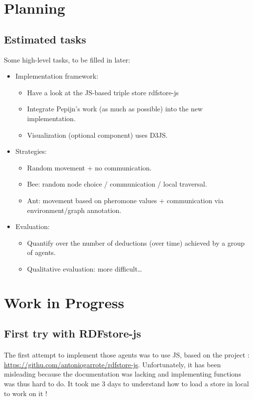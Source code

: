 \documentclass{article}
\newenvironment{itemh}[0]{\begin{itemize}[label=$\heartsuit$, font=\color{gray} \small]}{\end{itemize}}
\newenvironment{itemH}[0]{\begin{itemize}[label=$\heartsuit$, font=\color{gray} \large]}{\end{itemize}}
\begin{document}
\section{Planning}
	\subsection{Estimated tasks}
		Some high-level tasks, to be filled in later:
		\begin{itemH}
			\item Implementation framework:
				\begin{itemh}
					\item Have a look at the JS-based triple store rdfstore-js
					\item Integrate Pepijn’s work (as much as possible)  into the new implementation.
					\item Visualization (optional component) uses D3JS.
				\end{itemh}
			\item Strategies:
				\begin{itemh}
					\item Random movement + no communication.
					\item Bee: random node choice / communication / local traversal.
					\item Ant: movement based on pheromone values + communication via environment/graph annotation.
				\end{itemh}
			\item Evaluation:
				\begin{itemh}
					\item Quantify over the number of deductions (over time) achieved by a group of agents.
					\item Qualitative evaluation: more difficult…
				\end{itemh}
		\end{itemH}

\section{Work in Progress}
	\subsection{First try with RDFstore-js}
		\paragraph{} The first attempt to implement those agents was to use JS, based on the project :
		\url{https://githu.com/antoniogarrote/rdfstore-js}.
		Unfortunately, it has been misleading because the documentation was lacking
		and implementing functions was thus hard to do.
		It took me 3 days to understand how to load a store in local to work on it !
\end{document}
